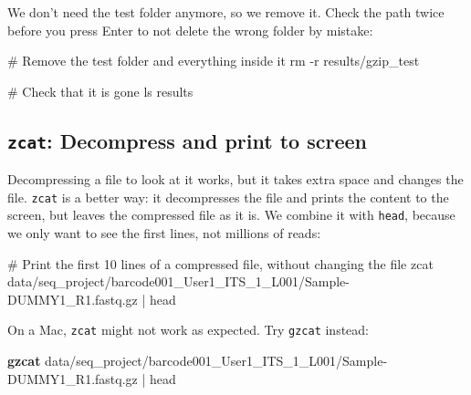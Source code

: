 \documentclass[
  letterpaper,
  DIV=11,
  numbers=noendperiod]{scrreprt}
\newenvironment{Shaded}{}{}
\newcommand{\AttributeTok}[1]{\textcolor[rgb]{0.84,0.23,0.29}{#1}}
\newcommand{\CommentTok}[1]{\textcolor[rgb]{0.42,0.45,0.49}{#1}}
\newcommand{\ExtensionTok}[1]{\textcolor[rgb]{0.84,0.23,0.29}{\textbf{#1}}}
\newcommand{\FunctionTok}[1]{\textcolor[rgb]{0.44,0.26,0.76}{#1}}
\newcommand{\KeywordTok}[1]{\textcolor[rgb]{0.84,0.23,0.29}{#1}}
\newcommand{\NormalTok}[1]{\textcolor[rgb]{0.14,0.16,0.18}{#1}}
\begin{document}
We don't need the test folder anymore, so we remove it. Check the path
twice before you press Enter to not delete the wrong folder by mistake:

\begin{Shaded}
\begin{Highlighting}[]
\CommentTok{\# Remove the test folder and everything inside it}
\FunctionTok{rm} \AttributeTok{{-}r}\NormalTok{ results/gzip\_test}

\CommentTok{\# Check that it is gone}
\FunctionTok{ls}\NormalTok{ results}
\end{Highlighting}
\end{Shaded}

\subsection{\texorpdfstring{\texttt{zcat}: Decompress and print to
screen}{zcat: Decompress and print to screen}}\label{zcat-decompress-and-print-to-screen}

Decompressing a file to look at it works, but it takes extra space and
changes the file. \texttt{zcat} is a better way: it decompresses the
file and prints the content to the screen, but leaves the compressed
file as it is. We combine it with \texttt{head}, because we only want to
see the first lines, not millions of reads:

\begin{Shaded}
\begin{Highlighting}[]
\CommentTok{\# Print the first 10 lines of a compressed file, without changing the file}
\FunctionTok{zcat}\NormalTok{ data/seq\_project/barcode001\_User1\_ITS\_1\_L001/Sample{-}DUMMY1\_R1.fastq.gz }\KeywordTok{|} \FunctionTok{head}
\end{Highlighting}
\end{Shaded}

\begin{tcolorbox}[enhanced jigsaw, coltitle=black, breakable, titlerule=0mm, colback=white, rightrule=.15mm, bottomrule=.15mm, toprule=.15mm, colframe=quarto-callout-important-color-frame, colbacktitle=quarto-callout-important-color!10!white, bottomtitle=1mm, opacitybacktitle=0.6, toptitle=1mm, leftrule=.75mm, arc=.35mm, title=\textcolor{quarto-callout-important-color}{\faExclamation}\hspace{0.5em}{\texttt{zcat} for Mac users}, left=2mm, opacityback=0]

On a Mac, \texttt{zcat} might not work as expected. Try \texttt{gzcat}
instead:

\begin{Shaded}
\begin{Highlighting}[]
\ExtensionTok{gzcat}\NormalTok{ data/seq\_project/barcode001\_User1\_ITS\_1\_L001/Sample{-}DUMMY1\_R1.fastq.gz }\KeywordTok{|} \FunctionTok{head}
\end{Highlighting}
\end{Shaded}

\end{tcolorbox}
\end{document}
